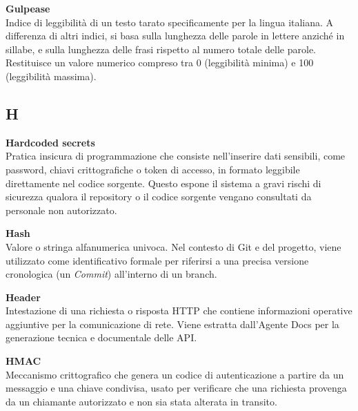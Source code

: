 \documentclass[12pt, a4paper]{article}
\begin{document}
\newpage
\noindent\hypertarget{gulpease}{\textbf{Gulpease}} \\[0.1em]
Indice di leggibilità di un testo tarato specificamente per la lingua italiana. A differenza di altri indici, si basa sulla lunghezza delle parole in lettere anziché in sillabe, e sulla lunghezza delle frasi rispetto al numero totale delle parole. Restituisce un valore numerico compreso tra 0 (leggibilità minima) e 100 (leggibilità massima).
\vspace{0.1cm}
\newpage

\subsection*{H}
{}
\vspace{0.2cm}

\noindent\hypertarget{hardcoded-secrets}{\textbf{Hardcoded secrets}} \\[0.1em]
Pratica insicura di programmazione che consiste nell'inserire dati sensibili, come password, chiavi crittografiche o token di accesso, in formato leggibile direttamente nel codice sorgente. Questo espone il sistema a gravi rischi di sicurezza qualora il repository o il codice sorgente vengano consultati da personale non autorizzato.
\vspace{0.5cm}

\noindent\hypertarget{hash}{\textbf{Hash}} \\[0.1em]
Valore o stringa alfanumerica univoca. Nel contesto di Git e del progetto, viene utilizzato come identificativo formale per riferirsi a una precisa versione cronologica (un \textit{Commit}) all'interno di un branch.
\vspace{0.5cm}  

\noindent\hypertarget{header}{\textbf{Header}} \\[0.1em]
Intestazione di una richiesta o risposta HTTP che contiene informazioni operative aggiuntive per la comunicazione di rete. Viene estratta dall'Agente Docs per la generazione tecnica e documentale delle API.
\vspace{0.5cm}

\noindent\hypertarget{hmac}{\textbf{HMAC}} \\[0.1em]
Meccanismo crittografico che genera un codice di autenticazione a partire da un messaggio e una chiave condivisa, usato per verificare che una richiesta provenga da un chiamante autorizzato e non sia stata alterata in transito.
\vspace{0.5cm}
\end{document}
